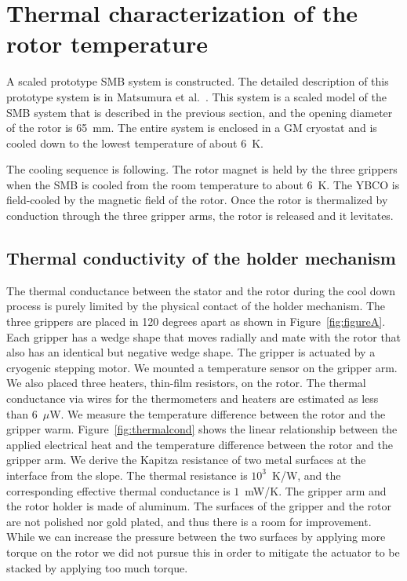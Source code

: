 \documentclass[journal]{IEEEtran}
\begin{document}
\section{Thermal characterization of the rotor temperature}
A scaled prototype SMB system is constructed.
The detailed description of this prototype system is in Matsumura et al.~\cite{matsumura_eucas2015}.
This system is a scaled model of the SMB system that is described in the previous section, and the opening diameter of the rotor is 65~mm.
The entire system is enclosed in a GM cryostat and is cooled down to the lowest temperature of about 6~K.

The cooling sequence is following.
The rotor magnet is held by the three grippers when the SMB is cooled from the room temperature to about 6~K.
The YBCO is field-cooled by the magnetic field of the rotor.
Once the rotor is thermalized by conduction through the three gripper arms, the rotor is released and it levitates.

\subsection{Thermal conductivity of the holder mechanism}
The thermal conductance between the stator and the rotor during the cool down process is purely limited by the physical contact of the holder mechanism.
The three grippers are placed in 120 degrees apart as shown in Figure~\ref{fig:figureA}.
Each gripper has a wedge shape that moves radially and mate with the rotor that also has an identical but negative wedge shape.
The gripper is actuated by a cryogenic stepping motor.
We mounted a temperature sensor on the gripper arm.
We also placed three heaters, thin-film resistors, on the rotor.
The thermal conductance via wires for the thermometers and heaters are estimated as less than 6~$\mu$W.
We measure the temperature difference between the rotor and the gripper warm.
Figure~\ref{fig:thermalcond} shows the linear relationship between the applied electrical heat and the temperature difference between the rotor and the gripper arm.
We derive the Kapitza resistance of two metal surfaces at the interface from the slope.
The thermal resistance is $10^{3}$~K/W, and the corresponding effective thermal conductance is $1$~mW/K.
The gripper arm and the rotor holder is made of aluminum.
The surfaces of the gripper and the rotor are not polished nor gold plated, and thus there is a room for improvement.
While we can increase the pressure between the two surfaces by applying more torque on the rotor we did not pursue this in order to mitigate the actuator to be stacked by applying too much torque.
\end{document}
